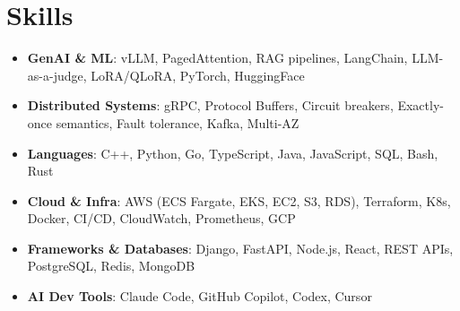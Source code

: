 \documentclass[letterpaper,11pt]{article}
\newcommand{\resumeSubHeadingListStart}{\begin{itemize}[leftmargin=0.15in, label={}]}
\newcommand{\resumeSubHeadingListEnd}{\end{itemize}}
\newcommand{\resumeSkillHeading}[2]{%
  \item\small{\textbf{#1}: #2 \vspace{-9pt}}%
}
\begin{document}
\section{Skills}
  \resumeSubHeadingListStart
    \resumeSkillHeading{GenAI \& ML}{vLLM, PagedAttention, RAG pipelines, LangChain, LLM-as-a-judge, LoRA/QLoRA, PyTorch, HuggingFace}
    \resumeSkillHeading{Distributed Systems}{gRPC, Protocol Buffers, Circuit breakers, Exactly-once semantics, Fault tolerance, Kafka, Multi-AZ}
    \resumeSkillHeading{Languages}{C++, Python, Go, TypeScript, Java, JavaScript, SQL, Bash, Rust}
    \resumeSkillHeading{Cloud \& Infra}{AWS (ECS Fargate, EKS, EC2, S3, RDS), Terraform, K8s, Docker, CI/CD, CloudWatch, Prometheus, GCP}
    \resumeSkillHeading{Frameworks \& Databases}{Django, FastAPI, Node.js, React, REST APIs, PostgreSQL, Redis, MongoDB}
    \resumeSkillHeading{AI Dev Tools}{Claude Code, GitHub Copilot, Codex, Cursor}
  \resumeSubHeadingListEnd
\end{document}
